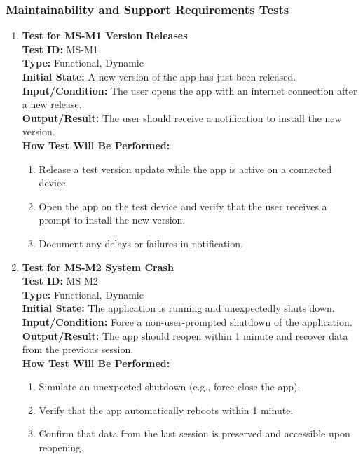 \documentclass[12pt, titlepage]{article}
\begin{document}
\subsubsection{Maintainability and Support Requirements Tests}
\begin{enumerate}
    \item \textbf{Test for MS-M1 Version Releases} \\
      \newline
      \textbf{Test ID:} MS-M1 \\
      \textbf{Type:} Functional, Dynamic \\
      \textbf{Initial State:} A new version of the app has just been released. \\
      \textbf{Input/Condition:} The user opens the app with an internet connection after a new release. \\
      \textbf{Output/Result:} The user should receive a notification to install the new version. \\
      \textbf{How Test Will Be Performed:}
      \begin{enumerate}
          \item Release a test version update while the app is active on a connected device.
          \item Open the app on the test device and verify that the user receives a prompt to install the new version.
          \item Document any delays or failures in notification.
      \end{enumerate}

    \item \textbf{Test for MS-M2 System Crash} \\
      \newline
      \textbf{Test ID:} MS-M2 \\
      \textbf{Type:} Functional, Dynamic \\
      \textbf{Initial State:} The application is running and unexpectedly shuts down. \\
      \textbf{Input/Condition:} Force a non-user-prompted shutdown of the application. \\
      \textbf{Output/Result:} The app should reopen within 1 minute and recover data from the previous session. \\
      \textbf{How Test Will Be Performed:}
      \begin{enumerate}
          \item Simulate an unexpected shutdown (e.g., force-close the app).
          \item Verify that the app automatically reboots within 1 minute.
          \item Confirm that data from the last session is preserved and accessible upon reopening.
      \end{enumerate}


\end{enumerate}
\end{document}
